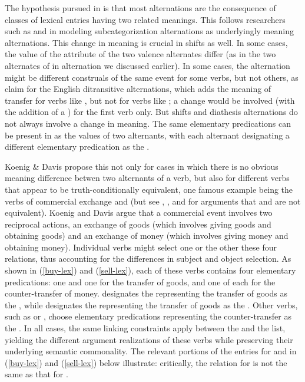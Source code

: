 \documentclass[output=paper]{langsci/langscibook}
\begin{document}
The hypothesis pursued in \citet{Davis1996,Davis2001}  is that 
most alternations are the consequence of classes of lexical entries having
two related meanings. This follows researchers such as \citet{Pinker1989} and \citet{Levin1993} in modeling subcategorization alternations as underlyingly meaning alternations. 
This change in meaning is crucial in \citet{KoenigandDavis2006}  shifts as well. In some cases, the value of the \rels attribute of the two valence alternates differ (as in the two alternates of  in  alternation we discussed earlier).
In some cases, the alternation might be different construals of the same event for some verbs, but not others, as \citet{RappaportandLevin2008} claim for the English ditransitive alternations, which adds the meaning of transfer for verbs like , but not for verbs like ; a  change would be involved (with the addition of a ) for the first verb only. But  shifts and diathesis alternations do not always involve a change in meaning. The same elementary predications can be present in as the  values of two alternants, with each alternant designating a different elementary predication as the . 

Koenig \& Davis propose this not only for cases in which there is no obvious meaning difference betwen two alternants of a verb, but also for different verbs that appear to be truth-conditionally equivalent, one famous example being the verbs of commercial exchange  and  (but see \citet[387-388]{VanValin1999}, \citet[20]{LevinandRappaport2005}, and \citet{Wechsler:2005} for arguments that  and  are not equivalent). Koenig and Davis argue that a commercial event involves two reciprocal actions, an exchange of goods (which involves giving goods and obtaining goods) and an exchange of money (which involves giving money and obtaining money). Individual verbs might select  one or the other these four relations, thus accounting for the differences in subject and object selection. As shown in (\ref{buy-lex}) and (\ref{sell-lex}), each of these verbs contains four elementary predications: one  and one  for the transfer of goods, and one of each for the counter-transfer of money.  designates the  representing the transfer of goods as the , while  designates the  representing the transfer of goods as the .  Other verbs, such as  or , choose elementary predications representing the counter-transfer as the .  In all cases, the same linking constraints apply between the   and the \argst list, yielding the different argument realizations of these verbs while preserving their underlying semantic commonality. The relevant portions of the entries for  and  in (\ref{buy-lex}) and (\ref{sell-lex}) below illustrate: critically, the  relation for  is not the same as that for .
\end{document}
